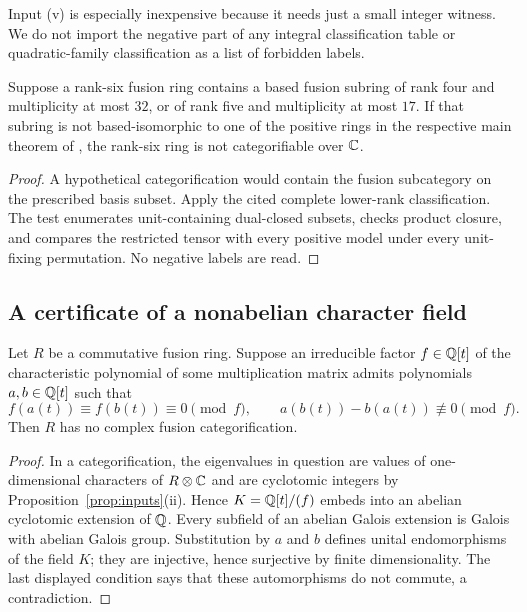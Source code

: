 Input (v) is especially inexpensive because it needs just a small
integer witness. We do not import the negative part of any integral
classification table or quadratic-family classification as a list of
forbidden labels.

\begin{corollary}\label{cor:subring}
Suppose a rank-six fusion ring contains a based fusion subring of rank
four and multiplicity at most $32$, or of rank five and multiplicity at
most $17$. If that subring is not based-isomorphic to one of the positive
rings in the respective main theorem of \cite{DP4,DP5}, the rank-six
ring is not categorifiable over $\mathbb C$.
\end{corollary}
\begin{proof}
A hypothetical categorification would contain the fusion subcategory
on the prescribed basis subset. Apply the cited complete lower-rank
classification. The test enumerates unit-containing dual-closed subsets,
checks product closure, and compares the restricted tensor with every
positive model under every unit-fixing permutation. No negative labels
are read.
\end{proof}


\subsection{A certificate of a nonabelian character field}
\begin{theorem}\label{thm:automorphisms}
Let $R$ be a commutative fusion ring. Suppose an irreducible factor
$f\in\mathbb Q[t]$ of the characteristic polynomial of some multiplication
matrix admits polynomials $a,b\in\mathbb Q[t]$ such that
\[
 f(a(t))\equiv f(b(t))\equiv0\pmod f,
 \qquad a(b(t))-b(a(t))\not\equiv0\pmod f.
\]
Then $R$ has no complex fusion categorification.
\end{theorem}
\begin{proof}
In a categorification, the eigenvalues in question are values of
one-dimensional characters of $R\otimes\mathbb C$ and are cyclotomic integers
by Proposition~\ref{prop:inputs}(ii). Hence $K=\mathbb Q[t]/(f)$ embeds into an
abelian cyclotomic extension of $\mathbb Q$. Every subfield of an abelian
Galois extension is Galois with abelian Galois group. Substitution by
$a$ and $b$ defines unital endomorphisms of the field $K$; they are
injective, hence surjective by finite dimensionality. The last displayed
condition says that these automorphisms do not commute, a contradiction.
\end{proof}

